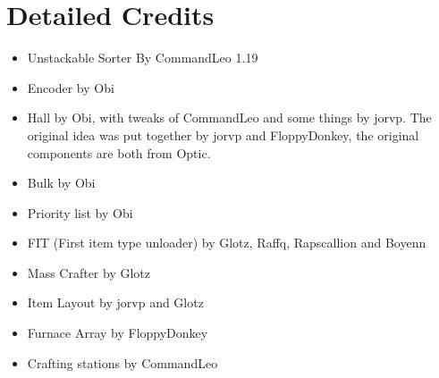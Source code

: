 \documentclass[10pt]{datasheet}
\begin{document}
\section{Detailed Credits}
\begin{itemize}
\item{Unstackable Sorter By CommandLeo 1.19}
\item{Encoder by Obi}
\item{Hall by Obi, with tweaks of CommandLeo and some things by jorvp. The original idea was put together by jorvp and FloppyDonkey, the original components are both from Optic.}
\item{Bulk by Obi}
\item{Priority list by Obi}
\item{FIT (First item type unloader) by Glotz, Raffq, Rapscallion and Boyenn}
\item{Mass Crafter by Glotz}
\item{Item Layout by jorvp and Glotz}
\item{Furnace Array by FloppyDonkey}
\item{Crafting stations by CommandLeo}
\end{itemize}
\end{document}
